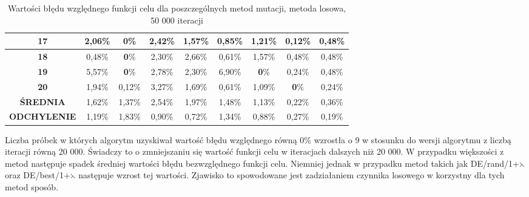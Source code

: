 \begin{itemize}
\begin{table}[h!]
\begin{center}
{\begin{tabular}{|c|c|c|c|c|c|c|c|c|}
\textbf{17}&2,06\%&\color{green}\textbf{0}\%&2,42\%&1,57\%&0,85\%&1,21\%&0,12\%&0,48\% \\ \hline
\textbf{18}&0,48\%&\color{green}\textbf{0}\%&2,30\%&2,66\%&0,61\%&1,57\%&0,48\%&0,48\% \\ \hline
\textbf{19}&5,57\%&\color{green}\textbf{0}\%&2,78\%&2,30\%&6,90\%&\color{green}\textbf{0}\%&0,24\%&0,48\% \\ \hline
\textbf{20}&1,94\%&0,12\%&3,27\%&1,69\%&0,61\%&1,09\%&\color{green}\textbf{0}\%&0,24\% \\ \hline
\textbf{ŚREDNIA}&1,62\%&1,37\%&2,54\%&1,97\%&1,48\%&1,13\%&0,22\%&0,36\% \\ \hline
\textbf{ODCHYLENIE}&1,19\%&1,83\%&0,90\%&0,72\%&1,34\%&0,88\%&0,27\%&0,19\% \\ \hline
\end{tabular}}
\caption{Wartości błędu względnego funkcji celu dla poszczególnych metod mutacji, metoda losowa, 50 000 iteracji}
\label{losowa50}
\end{center}
\end{table}

Liczba próbek w których algorytm uzyskiwał wartość błędu względnego równą 0\% wzrostła o 9 w stosunku do wersji algorytmu z liczbą iteracji równą 20 000. Świadczy to o zmniejszaniu się wartość funkcji celu w iteracjach dalszych niż 20 000. W przypadku większości z metod następuje spadek średniej wartości błędu bezwzględnego funkcji celu. Niemniej jednak w przypadku metod takich jak DE/rand/1+$\leftthreetimes$ oraz DE/best/1+$\leftthreetimes$ następuje wzrost tej wartości. Zjawisko to spowodowane jest zadziałaniem czynnika losowego w korzystny dla tych metod sposób. 

\begin{table}[h!]
\begin{center}
\caption{Ranking metod mutacji na podstawie średniej wartości błędu względnego funkcji celu, metoda losowa, 50 000 iteracji}
\label{ranking3}
\end{center}
\end{table}


\end{itemize}
